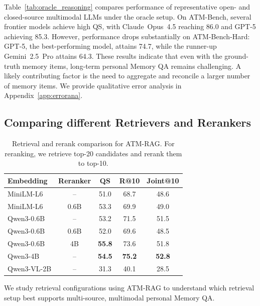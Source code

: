 \documentclass{article}
\theoremstyle{plain}
\theoremstyle{definition}
\theoremstyle{remark}
\begin{document}
Table~\ref{tab:oracle_reasoning} compares performance of representative open- and closed-source multimodal LLMs under the oracle setup. On ATM-Bench, several frontier models achieve high QS, with Claude~Opus~4.5 reaching 86.0 and GPT-5 achieving 85.3. However, performance drops substantially on ATM-Bench-Hard: GPT-5, the best-performing model, attains 74.7, while the runner-up Gemini~2.5~Pro attains 64.3. These results indicate that even with the ground-truth memory items, long-term personal Memory QA remains challenging. A likely contributing factor is the need to aggregate and reconcile a larger number of memory items. We provide qualitative error analysis in Appendix~\ref{app:errorana}.


\subsection{Comparing different Retrievers and Rerankers}
\label{sec:retrieval_ablation}
\begin{table}[htb]
\centering
\small
\setlength{\tabcolsep}{6pt}
\caption{Retrieval and rerank comparison for ATM-RAG. For reranking, we retrieve top-20 candidates and rerank them to top-10.}
\label{tab:retrieval_ablation}
\begin{tabular}{l c c c c}
\toprule
\textbf{Embedding} & \textbf{Reranker} &
\textbf{QS} & \textbf{R@10} & \textbf{Joint@10} \\
\midrule
MiniLM-L6     & --   & 51.0 & 68.7 & 48.6 \\
MiniLM-L6     & 0.6B & 53.3 & 69.9 & 49.0 \\
Qwen3-0.6B    & --   & 53.2 & 71.5 & 51.5 \\
Qwen3-0.6B    & 0.6B & 52.0 & 69.6 & 48.5 \\
Qwen3-0.6B    & 4B   & \textbf{55.8} & 73.6 & 51.8 \\
Qwen3-4B      & --   & \textbf{54.5} & \textbf{75.2} & \textbf{52.8} \\
Qwen3-VL-2B   & --   & 31.3 & 40.1 & 28.5 \\
\bottomrule
\end{tabular}
\end{table}

We study retrieval configurations using ATM-RAG to understand which retrieval setup best supports multi-source, multimodal personal Memory QA. %
\end{document}
